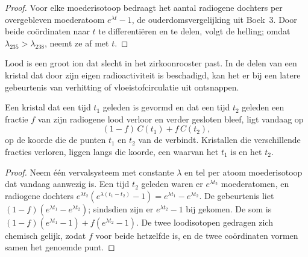 \begin{proof}
Voor elke moederisotoop bedraagt het aantal radiogene dochters per overgebleven moederatoom
$e^{\lambda t} - 1$, de ouderdomsvergelijking uit Boek~3. Door beide
coördinaten naar $t$ te differentiëren en te delen, volgt de helling; omdat
$\lambda_{235} > \lambda_{238}$, neemt ze af met $t$.
\end{proof}

Lood is een groot ion dat slecht in het zirkoonrooster past. In de delen van een
kristal dat door zijn eigen radioactiviteit is beschadigd, kan het er bij een latere
gebeurtenis van verhitting of vloeistofcirculatie uit ontsnappen.

\begin{theorem}\label{thm:b3:advanced-geochronology:discordia}
Een kristal dat een tijd $t_1$ geleden is gevormd en dat een tijd $t_2$ geleden een fractie $f$
van zijn radiogene lood verloor en verder gesloten bleef, ligt vandaag op
\[
(1 - f)\,C(t_1) + f\,C(t_2),
\]
op de koorde die de punten $t_1$ en $t_2$ van de  verbindt. Kristallen die
verschillende fracties verloren, liggen langs die koorde, een  waarvan het  $t_1$ is en het  $t_2$.
\end{theorem}

\begin{proof}
Neem één vervalsysteem met constante $\lambda$ en tel per atoom moederisotoop
dat vandaag aanwezig is. Een tijd $t_2$ geleden waren er $e^{\lambda t_2}$ moederatomen, en
radiogene dochters $e^{\lambda t_2}(e^{\lambda(t_1 - t_2)} - 1) =
e^{\lambda t_1} - e^{\lambda t_2}$. De gebeurtenis liet $(1 - f)(e^{\lambda t_1} -
e^{\lambda t_2})$; sindsdien zijn er $e^{\lambda t_2} - 1$ bij gekomen. De
som is $(1 - f)(e^{\lambda t_1} - 1) + f(e^{\lambda t_2} - 1)$. De twee loodisotopen
gedragen zich chemisch gelijk, zodat $f$ voor beide hetzelfde is, en de twee
coördinaten vormen samen het genoemde punt.
\end{proof}

